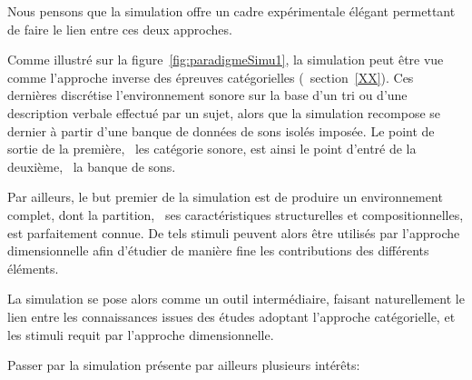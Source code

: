 Nous pensons que la simulation offre un cadre expérimentale élégant permettant de faire le lien entre ces deux approches.

Comme illustré sur la figure~\ref{fig:paradigmeSimu1}, la simulation peut être vue comme l'approche inverse des épreuves catégorielles (\cf~section~\ref{XX}). Ces dernières discrétise l'environnement sonore sur la base d'un tri ou d'une description verbale effectué par un sujet, alors que la simulation recompose se dernier à partir d'une banque de données de sons isolés imposée. Le point de sortie de la première, \ie~les catégorie sonore, est ainsi le point d'entré de la deuxième, \ie~la banque de sons.

Par ailleurs, le but premier de la simulation est de produire un environnement complet, dont la partition, \ie~ses caractéristiques structurelles et compositionnelles, est parfaitement connue. De tels stimuli peuvent alors être utilisés par l'approche dimensionnelle afin d'étudier de manière fine les contributions des différents éléments.

La simulation se pose alors comme un outil intermédiaire, faisant naturellement le lien entre les connaissances issues des études adoptant l'approche catégorielle, et les stimuli requit par l'approche dimensionnelle.

Passer par la simulation présente par ailleurs plusieurs intérêts:

